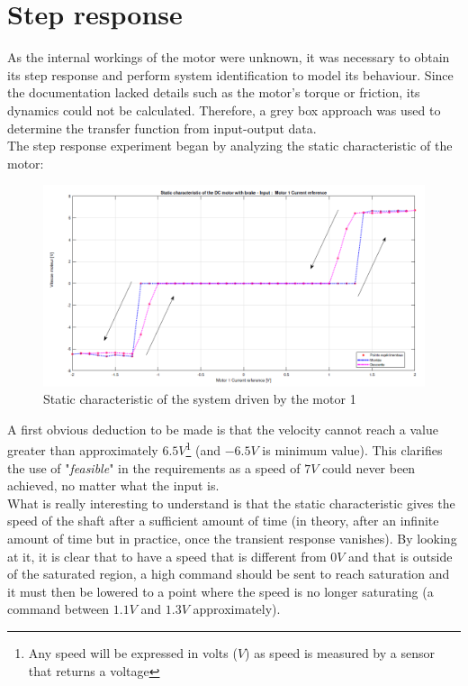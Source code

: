 \section{Step response}

As the internal workings of the motor were unknown, it was necessary to obtain its step response and perform system identification to model its behaviour. 
Since the documentation lacked details such as the motor's torque or friction, its dynamics could not be calculated. 
Therefore, a grey box approach was used to determine the transfer function from input-output data.\\

The step response experiment began by analyzing the static characteristic of the motor:

\begin{figure}[H]
    \centering
    \includegraphics[width=\textwidth]{Pictures/static_characteristic_motor_1.png}
    \caption{Static characteristic of the system driven by the motor 1}
    \label{fig:static_characteristic_motor_1}
\end{figure}

A first obvious deduction to be made is that the velocity cannot reach a value greater than approximately $6.5 V$\footnote{Any speed will be expressed in volts ($V$) as speed is measured by a sensor that returns a voltage} (and $-6.5 V$ is minimum value). This clarifies the use of "\textit{feasible}" in the requirements as a speed of $7 V$ could never been achieved, no matter what the input is.\\

What is really interesting to understand is that the static characteristic gives the speed of the shaft after a
sufficient amount of time (in theory, after an infinite amount of time but in practice, once the transient response 
vanishes). By looking at it, it is clear that to have a speed that is different from $0 V$ and that is outside of the
saturated region, a high command should be sent to reach saturation and it must then be lowered to a point where the
speed is no longer saturating (a command between $1.1 V$ and $1.3 V$ approximately).\\


